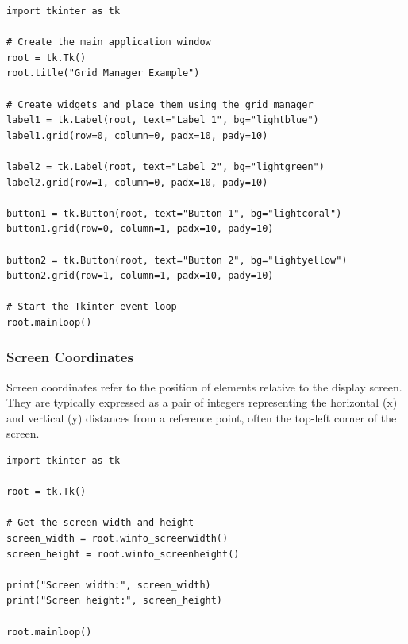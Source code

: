 \begin{codebox}
\begin{verbatim}
import tkinter as tk

# Create the main application window
root = tk.Tk()
root.title("Grid Manager Example")

# Create widgets and place them using the grid manager
label1 = tk.Label(root, text="Label 1", bg="lightblue")
label1.grid(row=0, column=0, padx=10, pady=10)

label2 = tk.Label(root, text="Label 2", bg="lightgreen")
label2.grid(row=1, column=0, padx=10, pady=10)

button1 = tk.Button(root, text="Button 1", bg="lightcoral")
button1.grid(row=0, column=1, padx=10, pady=10)

button2 = tk.Button(root, text="Button 2", bg="lightyellow")
button2.grid(row=1, column=1, padx=10, pady=10)

# Start the Tkinter event loop
root.mainloop()
\end{verbatim}
\end{codebox}

\newpage
\subsubsection{Screen Coordinates}
Screen coordinates refer to the position of elements relative to the display screen. They are typically expressed as a pair of integers representing the horizontal (x) and vertical (y) distances from a reference point, often the top-left corner of the screen.
\begin{codebox}
\begin{verbatim}
import tkinter as tk

root = tk.Tk()

# Get the screen width and height
screen_width = root.winfo_screenwidth()
screen_height = root.winfo_screenheight()

print("Screen width:", screen_width)
print("Screen height:", screen_height)

root.mainloop()
\end{verbatim}
\end{codebox}
